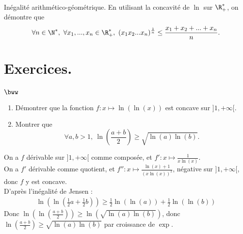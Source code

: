 \documentclass[11pt]{article}
\begin{document}
\vspace*{-0.4cm}

\begin{ex}{Inégalité arithmético-géométrique.}{}
    En utilisant la concavité de $\ln$ sur $\R_+^*$, on démontre que
    \begin{equation*}
        \forall n \in \N^*, ~ \forall x_1,...,x_n \in \R_+^*, ~ (x_1x_2...x_n)^{\frac{1}{n}}\leq\frac{x_1+x_2+...+x_n}{n}.
    \end{equation*}
\end{ex}

\section{Exercices.}

\begin{exercice}{$\bww$}{}
    \begin{enumerate}
        \item Démontrer que la fonction $f:x\mapsto\ln(\ln(x))$ est concave sur $]1,+\infty[$.
        \item Montrer que
        \begin{equation*}
            \forall a,b > 1, ~ \ln\left( \frac{a+b}{2} \right) \geq \sqrt{\ln(a)\ln(b)}.
        \end{equation*}
    \end{enumerate}
    \tcblower
     On a $f$ dérivable sur $]1,+\infty[$ comme composée, et $f':x\mapsto\frac{1}{x\ln(x)}$.\\
    On a $f'$ dérivable comme quotient, et $f'':x\mapsto\frac{\ln(x)+1}{(x\ln(x))^2}$, négative sur $]1,+\infty[$, donc $f$ y est concave.\\
     D'après l'inégalité de Jensen :
    \begin{align*}
        \ln(\ln(\frac{1}{2}a+\frac{1}{2}b)) \geq \frac{1}{2}\ln(\ln(a))+\frac{1}{2}\ln(\ln(b))
    \end{align*}
    Donc $\ln(\ln(\frac{a+b}{2}))\geq\ln(\sqrt{\ln(a)\ln(b)})$, donc $\ln(\frac{a+b}{2})\geq\sqrt{\ln(a)\ln(b)}$ par croissance de $\exp$.
\end{exercice}
\end{document}
